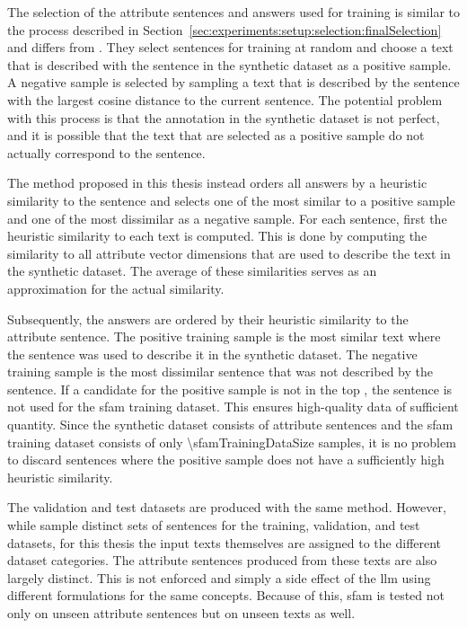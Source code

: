 The selection of the attribute sentences and answers used for training is similar to the process described in Section~\ref{sec:experiments:setup:selection:finalSelection} and differs from \citet{patelLearningInterpretableStyle2023}. They select sentences for training at random and choose a text that is described with the sentence in the synthetic dataset as a positive sample. A negative sample is selected by sampling a text that is described by the sentence with the largest cosine distance to the current sentence.
The potential problem with this process is that the annotation in the synthetic dataset is not perfect, and it is possible that the text that are selected as a positive sample do not actually correspond to the sentence.

The method proposed in this thesis instead orders all answers by a heuristic similarity to the sentence and selects one of the most similar to a positive sample and one of the most dissimilar as a negative sample. For each sentence, first the heuristic similarity to each text is computed. This is done by computing the similarity to all attribute vector dimensions that are used to describe the text in the synthetic dataset. The average of these similarities serves as an approximation for the actual similarity.

Subsequently, the answers are ordered by their heuristic similarity to the attribute sentence. The positive training sample is the most similar text where the sentence was used to describe it in the synthetic dataset. The negative training sample is the most dissimilar sentence that was not described by the sentence. If a candidate for the positive sample is not in the top \sfamDataTopPercentText{}, the sentence is not used for the \ac{sfam} training dataset. This ensures high-quality data of sufficient quantity.
Since the synthetic dataset consists of \numStyleSentencesText{} attribute sentences and the \ac{sfam} training dataset consists of only \num{\sfamTrainingDataSize} samples, it is no problem to discard sentences where the positive sample does not have a sufficiently high heuristic similarity.

The validation and test datasets are produced with the same method. However, while \citet{patelLearningInterpretableStyle2023} sample distinct sets of sentences for the training, validation, and test datasets, for this thesis the input texts themselves are assigned to the different dataset categories. The attribute sentences produced from these texts are also largely distinct. This is not enforced and simply a side effect of the \ac{llm} using different formulations for the same concepts. %
Because of this, \ac{sfam} is tested not only on unseen attribute sentences but on unseen texts as well.

